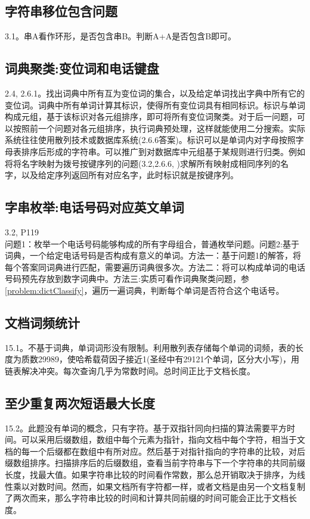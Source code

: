 \subsection{字符串移位包含问题}
\cite{bop}3.1。串A看作环形，是否包含串B。判断A+A是否包含B即可。


\subsection{词典聚类:变位词和电话键盘}
\cite{pp}2.4, 2.6.1。找出词典中所有互为变位词的集合，以及给定单词找出字典中所有它的变位词。词典中所有单词计算其标识，使得所有变位词具有相同标识。标识与单词构成元组，基于该标识对各元组排序，即可将所有变位词聚类。对于后一问题，可以按照前一个问题对各元组排序，执行词典预处理，这样就能使用二分搜索。实际系统往往使用散列技术或数据库系统(\cite{pp}2.6.6答案)。标识可以是单词内对字母按照字母表排序后形成的字符串。可以推广到对数据库中元组基于某规则进行归类。例如将将名字映射为拨号按键序列的问题(\cite{bop}3.2,\cite{pp}2.6.6, \cite{pie})求解所有映射成相同序列的名字，以及给定序列返回所有对应名字，此时标识就是按键序列。
\label{problem:dictClassify}

\subsection{字串枚举:电话号码对应英文单词}
\cite{bop}3.2, \cite{pie}P119\\
问题1：枚举一个电话号码能够构成的所有字母组合，普通枚举问题。问题2:基于词典，一个给定电话号码是否构成有意义的单词。方法一：基于问题1的解答，将每个答案同词典进行匹配，需要遍历词典很多次。方法二：将可以构成单词的电话号码预先存放到数字词典中。方法三:实质可看作词典聚类问题，参\ref{problem:dictClassify}，遍历一遍词典，判断每个单词是否符合这个电话号。

\subsection{文档词频统计}
\cite{pp}15.1。不基于词典，单词词形没有限制。利用散列表存储每个单词的词频，表的长度为质数29989，使哈希载荷因子接近1(圣经中有29121个单词，区分大小写)，用链表解决冲突。每次查询几乎为常数时间。总时间正比于文档长度。

\subsection{至少重复两次短语最大长度}
\cite{pp}15.2。此题没有单词的概念，只有字符。基于双指针同向扫描的算法需要平方时间。可以采用后缀数组，数组中每个元素为指针，指向文档中每个字符，相当于文档的每一个后缀都在数组中有所对应。然后基于对指针指向的字符串的比较，对后缀数组排序。扫描排序后的后缀数组，查看当前字符串与下一个字符串的共同前缀长度，找最大值。如果字符串比较的时间看作常数，那么总开销取决于排序，为线性乘以对数时间。然而，如果文档所有字符都一样，或者文档是由另一个文档复制了两次而来，那么字符串比较的时间和计算共同前缀的时间可能会正比于文档长度。

